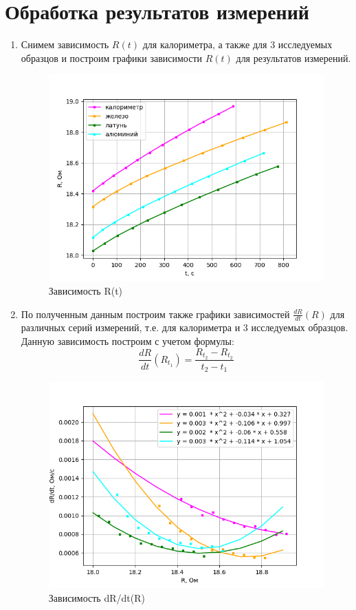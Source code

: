 \documentclass[12pt,a4paper]{article}
\begin{document}
\section{Обработка результатов измерений}
\begin{enumerate}

\item  Снимем зависимость $R(t)$ для калориметра, а также для 3 исследуемых образцов и построим графики зависимости $R(t)$ для результатов измерений.
\begin{figure}[h!]
    \centering
    \includegraphics[scale=0.72]{R(t).png}
    \caption{Зависимость R(t)}
\end{figure}
\item  По полученным данным построим также графики зависимостей $\frac{dR}{dt} \left( R \right)$ для различных серий измерений, т.е. для калориметра и 3 исследуемых образцов. Данную зависимость построим с учетом формулы:
\begin{equation}
		\frac{dR}{dt} \left( R_{t_{1}} \right) = \frac{R_{t_{2}} - R_{t_{2}}}{t_{2} - t_{1}}
		\label{eq:derivates}
	\end{equation}

\begin{figure}[h!]
    \centering
    \includegraphics[scale=0.72]{dRdt(R).png}
    \caption{Зависимость dR/dt(R)}
\end{figure}


\end{enumerate}
\end{document}
